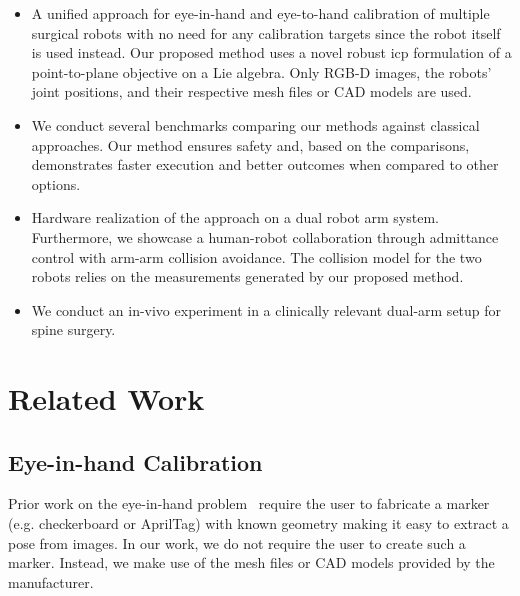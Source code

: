 \begin{itemize}
    \item A unified approach for eye-in-hand and eye-to-hand calibration of multiple surgical robots with no need for any calibration targets since the robot itself is used instead. Our proposed method uses a novel robust \acrfull{icp} formulation of a point-to-plane objective on a Lie algebra. Only RGB-D images, the robots' joint positions, and their respective mesh files or CAD models are used.
    \item We conduct several benchmarks comparing our methods against classical approaches. Our method ensures safety and, based on the comparisons, demonstrates faster execution and better outcomes when compared to other options.
    \item Hardware realization of the approach on a dual robot arm system. Furthermore, we showcase a human-robot collaboration through admittance control with arm-arm collision avoidance. The collision model for the two robots relies on the measurements generated by our proposed method.
    \item We conduct an in-vivo experiment in a clinically relevant dual-arm setup for spine surgery.
\end{itemize}




\section{Related Work}
\subsection{Eye-in-hand Calibration}
Prior work on the eye-in-hand problem~\cite{Horaud95, Strobl06} require the user to fabricate a marker (e.g. checkerboard or AprilTag\cite{Olson11}) with known geometry making it easy to extract a pose from images. In our work, we do not require the user to create such a marker.
Instead, we make use of the mesh files or CAD models provided by the manufacturer.

